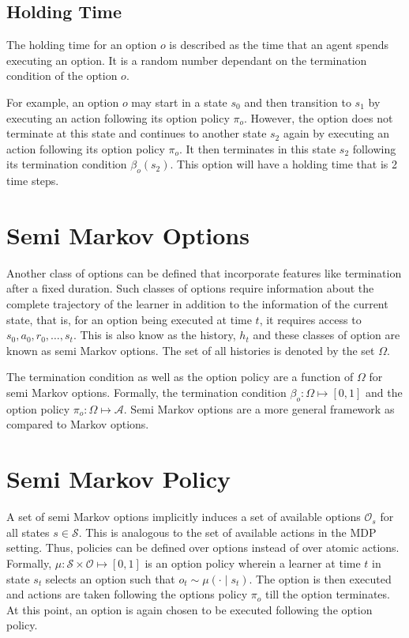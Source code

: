\subsection{Holding Time}\label{sec:holding_time}

The holding time for an option $o$ is described as the time that an agent spends executing an option. It is a random number dependant on the termination condition of the option $o$.

For example, an option $o$ may start in a state $s_0$ and then transition to $s_1$ by executing an action following its option policy $\pi_o$. 
However, the option does not terminate at this state and continues to another state $s_2$ again by executing an action following its option policy $\pi_o$.
It then terminates in this state $s_2$ following its termination condition $\beta_o(s_2)$.
This option will have a holding time that is 2 time steps.

\section{Semi Markov Options}

Another class of options can be defined that incorporate features like termination after a fixed duration.
Such classes of options require information about the complete trajectory of the learner in addition to the information of the current state, that is, for an option being executed at time $t$, it requires access to $s_0, a_0, r_0, \dots, s_t$.
This is also know as the history, $h_t$ and these classes of option are known as semi Markov options.
The set of all histories is denoted by the set $\Omega$.

The termination condition as well as the option policy are a function of $\Omega$ for semi Markov options.
Formally, the termination condition $\beta_o : \Omega \mapsto [0, 1]$ and the option policy $\pi_o : \Omega \mapsto \mathcal{A}$.
Semi Markov options are a more general framework as compared to Markov options.

\section{Semi Markov Policy}

A set of semi Markov options implicitly induces a set of available options $\mathcal{O}_s$ for all states $s \in \mathcal{S}$.
This is analogous to the set of available actions in the MDP setting.
Thus, policies can be defined over options instead of over atomic actions. 
Formally, $\mu : \mathcal{S} \times \mathcal{O} \mapsto [0,1]$ is an option policy wherein a learner at time $t$ in state $s_t$ selects an option such that $o_t \sim \mu(\cdot \mid s_t)$.
The option is then executed and actions are taken following the options policy $\pi_o$ till the option terminates.
At this point, an option is again chosen to be executed following the option policy.


